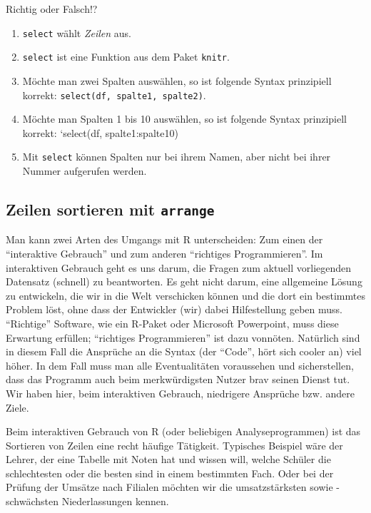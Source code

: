 \documentclass[12pt,ngerman,]{book}
\providecommand{\tightlist}{%
  \setlength{\itemsep}{0pt}\setlength{\parskip}{0pt}}
\let\BeginKnitrBlock\begin \let\EndKnitrBlock\end
\begin{document}
\BeginKnitrBlock{rmdexercises}
Richtig oder Falsch!?

\begin{enumerate}
\def\labelenumi{\arabic{enumi}.}
\tightlist
\item
  \texttt{select} wählt \emph{Zeilen} aus.
\item
  \texttt{select} ist eine Funktion aus dem Paket \texttt{knitr}.
\item
  Möchte man zwei Spalten auswählen, so ist folgende Syntax prinzipiell
  korrekt: \texttt{select(df,\ spalte1,\ spalte2)}.
\item
  Möchte man Spalten 1 bis 10 auswählen, so ist folgende Syntax
  prinzipiell korrekt: `select(df, spalte1:spalte10)
\item
  Mit \texttt{select} können Spalten nur bei ihrem Namen, aber nicht bei
  ihrer Nummer aufgerufen werden.
\end{enumerate}
\EndKnitrBlock{rmdexercises}

\subsection{\texorpdfstring{Zeilen sortieren mit
\texttt{arrange}}{Zeilen sortieren mit arrange}}\label{zeilen-sortieren-mit-arrange}

Man kann zwei Arten des Umgangs mit R unterscheiden: Zum einen der
``interaktive Gebrauch'' und zum anderen ``richtiges Programmieren''. Im
interaktiven Gebrauch geht es uns darum, die Fragen zum aktuell
vorliegenden Datensatz (schnell) zu beantworten. Es geht nicht darum,
eine allgemeine Lösung zu entwickeln, die wir in die Welt verschicken
können und die dort ein bestimmtes Problem löst, ohne dass der
Entwickler (wir) dabei Hilfestellung geben muss. ``Richtige'' Software,
wie ein R-Paket oder Microsoft Powerpoint, muss diese Erwartung
erfüllen; ``richtiges Programmieren'' ist dazu vonnöten. Natürlich sind
in diesem Fall die Ansprüche an die Syntax (der ``Code'', hört sich
cooler an) viel höher. In dem Fall muss man alle Eventualitäten
voraussehen und sicherstellen, dass das Programm auch beim
merkwürdigsten Nutzer brav seinen Dienst tut. Wir haben hier, beim
interaktiven Gebrauch, niedrigere Ansprüche bzw. andere Ziele.

Beim interaktiven Gebrauch von R (oder beliebigen Analyseprogrammen) ist
das Sortieren von Zeilen eine recht häufige Tätigkeit. Typisches
Beispiel wäre der Lehrer, der eine Tabelle mit Noten hat und wissen
will, welche Schüler die schlechtesten oder die besten sind in einem
bestimmten Fach. Oder bei der Prüfung der Umsätze nach Filialen möchten
wir die umsatzstärksten sowie -schwächsten Niederlassungen kennen.
\end{document}
